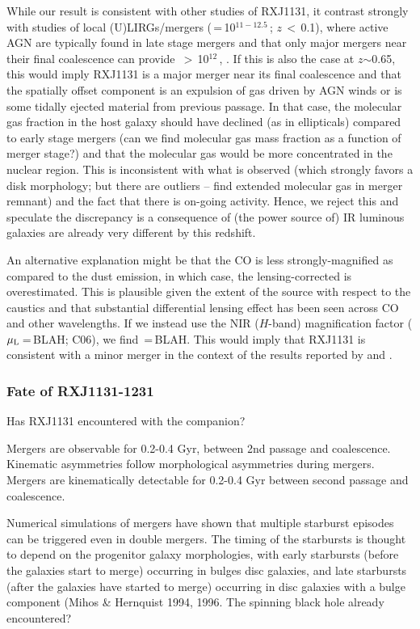 \documentclass[]{emulateapj}
\begin{document}
While our result is consistent with other studies of RXJ1131, it
contrast strongly with studies of local (U)LIRGs/mergers
(\LIR\,=\,10$^{11-12.5}$\,\Lsun; $z$\,$<$\,0.1), where active AGN are
typically found in late stage mergers
\citep{Yuan10a,Iwasawa11a,Carpineti12a} and
that only major mergers near their final
coalescence can provide \LIR\,$>$\,10$^{12}$\,\Lsun,
\citep[\eg][]{Carpineti15a,Larson16a}.
If this is also the case at $z$$\sim$0.65, this would imply RXJ1131
is a major merger near its final coalescence and that the spatially offset
component is an expulsion of gas driven by AGN winds or is some
tidally ejected material from previous passage.
In that case, the molecular gas fraction in the host
galaxy should have declined (as in ellipticals) compared to early
stage mergers (can we find molecular gas mass fraction as a
function of merger stage?) and that the molecular gas would
be more concentrated in the nuclear region.
This is inconsistent with what
is observed (which strongly favors a disk morphology;
but there are outliers --  \citet{Ueda14a} find
extended molecular gas in merger remnant) and
the fact that there is on-going \SF activity.
Hence, we reject this and speculate the discrepancy is a consequence
of (the power source of) IR luminous galaxies are already very different by this redshift.

An alternative explanation might be that the
CO is less strongly-magnified as compared to the dust emission,
in which case, the lensing-corrected \LFIR is overestimated.
This is plausible given the extent of the source with respect to the caustics
and that substantial differential lensing effect has been seen across CO and other
wavelengths. If we instead use the NIR ($H$-band) magnification factor ($\mu_{\rm L}$\,=\,BLAH; C06),
we find \LFIR\,=\,BLAH. This would imply that RXJ1131 is consistent with a minor
merger in the context of the results reported by \citet{Carpineti15a} and \citet{Larson16a}.

\subsubsection{Fate of RXJ1131-1231}
Has RXJ1131 encountered with the companion?

Mergers are observable for 0.2-0.4 Gyr,
between 2nd passage and coalescence.
Kinematic asymmetries follow morphological asymmetries during
mergers. Mergers are kinematically detectable for 0.2-0.4 Gyr
between second passage and coalescence.

Numerical simulations of mergers have shown that
multiple starburst episodes can be triggered even in double mergers.
The timing of the starbursts is thought to depend on the progenitor galaxy
morphologies, with early starbursts (before the galaxies start to merge)
occurring in bulges disc galaxies, and late starbursts (after the galaxies
have started to merge) occurring in disc galaxies with a bulge component (Mihos \& Hernquist 1994, 1996.
The spinning black hole already encountered?
\end{document}
